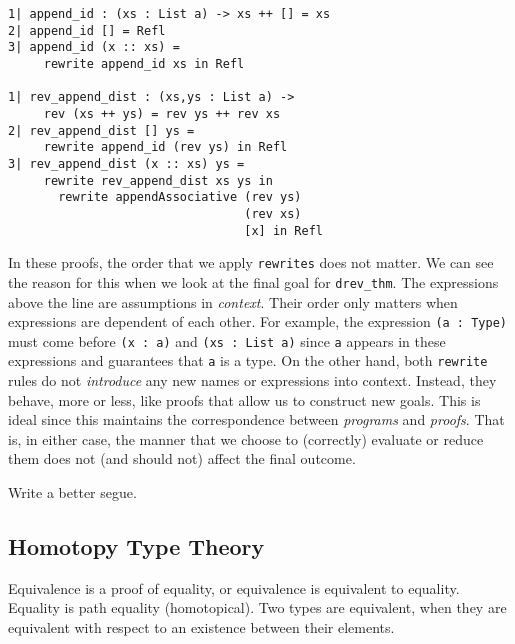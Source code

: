 \documentclass[9pt,preprint,nocopyrightspace,computermodern]{sigplanconf} %
\begin{document}
{\small
\begin{verbatim}
1| append_id : (xs : List a) -> xs ++ [] = xs
2| append_id [] = Refl
3| append_id (x :: xs) = 
     rewrite append_id xs in Refl

1| rev_append_dist : (xs,ys : List a) -> 
     rev (xs ++ ys) = rev ys ++ rev xs
2| rev_append_dist [] ys = 
     rewrite append_id (rev ys) in Refl
3| rev_append_dist (x :: xs) ys = 
     rewrite rev_append_dist xs ys in 
       rewrite appendAssociative (rev ys) 
                                 (rev xs) 
                                 [x] in Refl
\end{verbatim}
}

In these proofs, the order that we apply {\small\tt rewrites} does not matter.
We can see the reason for this when we look at the final goal for
{\small\tt drev\_thm}. The expressions above the line are assumptions in
\textit{context}. Their order only matters when expressions are dependent of
each other. For example, the expression \mbox{{\small\tt (a : Type)}} must
come before {\small\tt (x : a)} and \mbox{{\small\tt (xs : List a)}} since
{\small\tt a} appears in these expressions and guarantees that {\small\tt a}
is a type. On the other hand, both {\small\tt rewrite} rules do not
\textit{introduce} any new names or expressions into context. Instead, they behave,
more or less, like proofs that allow us to construct new goals. This is
ideal since this maintains the correspondence between \textit{programs} and
\textit{proofs}. That is, in either case, the manner that we choose to (correctly)
evaluate or reduce them does not (and should not) affect the final outcome.

Write a better segue.

\subsection*{Homotopy Type Theory}
Equivalence is a proof of equality, or equivalence is equivalent to equality. Equality is
path equality (homotopical). Two types are equivalent, when they are equivalent with
respect to an existence between their elements.
\end{document}
